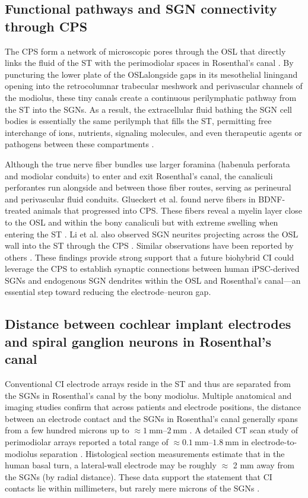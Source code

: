 \documentclass[referee,pdflatex, sn-vancouver-num]{sn-jnl}%
\theoremstyle{thmstyleone}%
\theoremstyle{thmstyletwo}%
\theoremstyle{thmstylethree}%
\begin{document}
\subsection{Functional pathways and SGN connectivity through CPS}
The CPS form a network of microscopic pores through the OSL that directly links the fluid of the ST with the perimodiolar spaces in Rosenthal's canal \cite{raskandersen2006}. By puncturing the lower plate of the OSL\textemdash alongside gaps in its mesothelial lining\textemdash and opening into the retrocolumnar trabecular meshwork and perivascular channels of the modiolus, these tiny canals create a continuous perilymphatic pathway from the ST into the SGNs. As a result, the extracellular fluid bathing the SGN cell bodies is essentially the same perilymph that fills the ST, permitting free interchange of ions, nutrients, signaling molecules, and even therapeutic agents or pathogens between these compartments \cite{Starovoyt2023_SciRep_CochlearMicrostructures}.

Although the true nerve fiber bundles use larger foramina (habenula perforata and modiolar conduits) to enter and exit Rosenthal's canal, the canaliculi perforantes run alongside and between those fiber routes, serving as perineural and perivascular fluid conduits. Glueckert et al. found nerve fibers in BDNF-treated animals that progressed into CPS. These fibers reveal a myelin layer close to the OSL and within the bony canaliculi but with extreme swelling when entering the ST \cite{glueckert2008}. Li et al. also observed SGN neurites projecting across the OSL wall into the ST through the CPS \cite{Li2017}. Similar observations have been reported by others \cite{Staecker1996, Leake2008, Leake2011, Wise2011}.  These findings provide strong support that a future biohybrid CI could leverage the CPS to establish synaptic connections between human iPSC-derived SGNs and endogenous SGN dendrites within the OSL and Rosenthal’s canal—an essential step toward reducing the electrode–neuron gap.

\subsection{Distance between cochlear implant electrodes and spiral ganglion neurons in Rosenthal's canal}
Conventional CI electrode arrays reside in the ST and thus are separated from the SGNs in Rosenthal's canal by the bony modiolus. Multiple anatomical and imaging studies confirm that across patients and electrode positions, the distance between an electrode contact and the SGNs in Rosenthal's canal generally spans from a few hundred microns up to $\approx \SIrange{1}{2}{\mm}$ \cite{Davis2016}. A detailed CT scan study of perimodiolar arrays reported a total range of $\approx \SIrange{0.1}{1.8}{\mm}$ in electrode-to-modiolus separation \cite{Long2014, Sharma2024_Laryngoscope_EMDApproach}. Histological section measurements estimate that in the human basal turn, a lateral-wall electrode may be roughly $\approx$ 2 mm away from the SGNs (by radial distance). These data support the statement that CI contacts lie within millimeters, but rarely mere microns of the SGNs \cite{Schmidbauer2023}.
\end{document}
